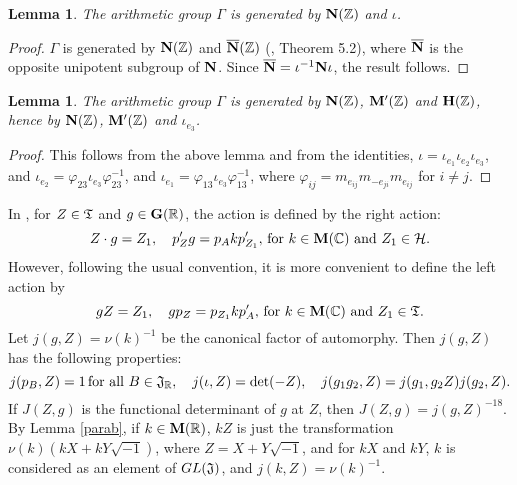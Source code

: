 \documentclass[11pt]{amsart}
\numberwithin{equation}{section}
\newtheorem{lemma}[theorem]{Lemma}
\theoremstyle{definition}
\begin{document}
\begin{lemma} The arithmetic group $\Gamma$ is generated by $\bold N({\mathbb{Z}})$ and $\iota$.
\end{lemma}
\begin{proof} $\Gamma$ is generated by $\bold N({\mathbb{Z}})$ and $\overline{\bold N}({\mathbb{Z}})$ (\cite{B}, Theorem 5.2), where $\overline{\bold N}$ is the opposite unipotent subgroup of $\bold N$. Since $\overline{\bold N}=\iota^{-1}\bold N\iota$, the result follows.
\end{proof}

\begin{lemma}\label{generator} The arithmetic group $\Gamma$ is generated by $\bold N({\mathbb{Z}})$, $\bold M'({\mathbb{Z}})$ and $\bold H({\mathbb{Z}})$, 
hence by $\bold N({\mathbb{Z}})$, $\bold M'({\mathbb{Z}})$ and $\iota_{e_3}$.
\end{lemma}
\begin{proof} This follows from the above lemma and from the identities, $\iota=\iota_{e_1}\iota_{e_2}\iota_{e_3}$, and
$\iota_{e_2}=\varphi_{23}\iota_{e_3}\varphi_{23}^{-1}$, and $\iota_{e_1}=\varphi_{13}\iota_{e_3}\varphi_{13}^{-1}$, where 
$\varphi_{ij}=m_{e_{ij}}m_{-e_{ji}}m_{e_{ij}}$ for $i\ne j$.
\end{proof}

In \cite{B, Ka, kim}, for $Z\in \frak T$ and $g\in \bold G({\mathbb{R}})$, the action is defined by the right action:
$$Z\cdot g=Z_1,\quad p_Z'g=p_A k p_{Z_1}',\, \text{for $k\in \bold M({\mathbb{C}})$ and $Z_1\in \mathcal H$}.
$$
However, following the usual convention, it is more convenient to define the left action by 
$$gZ=Z_1,\quad g p_Z=p_{Z_1} k p_A',\, \text{for $k\in \bold M({\mathbb{C}})$ and $Z_1\in \frak T$}.
$$
Let $j(g,Z)=\nu(k)^{-1}$ be the canonical factor of automorphy. Then $j(g,Z)$ has the following properties:
$$j(p_B,Z)=1\, \text{for all $B\in\frak J_{\mathbb{R}}$},\quad j(\iota,Z)=\det(-Z),\quad j(g_1g_2,Z)=j(g_1, g_2 Z)j(g_2,Z).
$$
If $J(Z,g)$ is the functional determinant of $g$ at $Z$, then $J(Z,g)=j(g,Z)^{-18}$. By Lemma \ref{parab}, if $k\in \bold M({\mathbb{R}})$, $kZ$ is just the transformation $\nu(k) (kX+kY\sqrt{-1})$, where $Z=X+Y\sqrt{-1}$, and for $kX$ and $kY$, $k$ is considered as an element of $GL(\frak J)$, and $j(k,Z)=\nu(k)^{-1}$.
\end{document}
